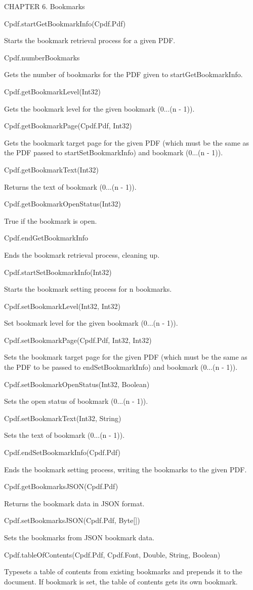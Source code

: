 CHAPTER 6. Bookmarks

Cpdf.startGetBookmarkInfo(Cpdf.Pdf)

Starts the bookmark retrieval process for a given PDF.

Cpdf.numberBookmarks

Gets the number of bookmarks for the PDF given to startGetBookmarkInfo.

Cpdf.getBookmarkLevel(Int32)

Gets the bookmark level for the given bookmark (0...(n - 1)).

Cpdf.getBookmarkPage(Cpdf.Pdf, Int32)

Gets the bookmark target page for the given PDF (which must be the same as the
PDF passed to startSetBookmarkInfo) and bookmark (0...(n - 1)).

Cpdf.getBookmarkText(Int32)

Returns the text of bookmark (0...(n - 1)).

Cpdf.getBookmarkOpenStatus(Int32)

True if the bookmark is open.

Cpdf.endGetBookmarkInfo

Ends the bookmark retrieval process, cleaning up.

Cpdf.startSetBookmarkInfo(Int32)

Starts the bookmark setting process for n bookmarks.

Cpdf.setBookmarkLevel(Int32, Int32)

Set bookmark level for the given bookmark (0...(n - 1)).

Cpdf.setBookmarkPage(Cpdf.Pdf, Int32, Int32)

Sets the bookmark target page for the given PDF (which must be the same as the
PDF to be passed to endSetBookmarkInfo) and bookmark (0...(n - 1)).

Cpdf.setBookmarkOpenStatus(Int32, Boolean)

Sets the open status of bookmark (0...(n - 1)).

Cpdf.setBookmarkText(Int32, String)

Sets the text of bookmark (0...(n - 1)).

Cpdf.endSetBookmarkInfo(Cpdf.Pdf)

Ends the bookmark setting process, writing the bookmarks to the given PDF.

Cpdf.getBookmarksJSON(Cpdf.Pdf)

Returns the bookmark data in JSON format.

Cpdf.setBookmarksJSON(Cpdf.Pdf, Byte[])

Sets the bookmarks from JSON bookmark data.

Cpdf.tableOfContents(Cpdf.Pdf, Cpdf.Font, Double, String, Boolean)

Typesets a table of contents from existing bookmarks and prepends it to the
document. If bookmark is set, the table of contents gets its own bookmark.
